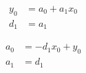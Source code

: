 \begin{align}
  y_0 & = a_0+a_1 x_0  \\
   d_1 & = a_1  
\end{align}

 
\begin{align}
  a_0 & =  - d_1 x_0+y_0  \\
   a_1 & = d_1  
\end{align}

